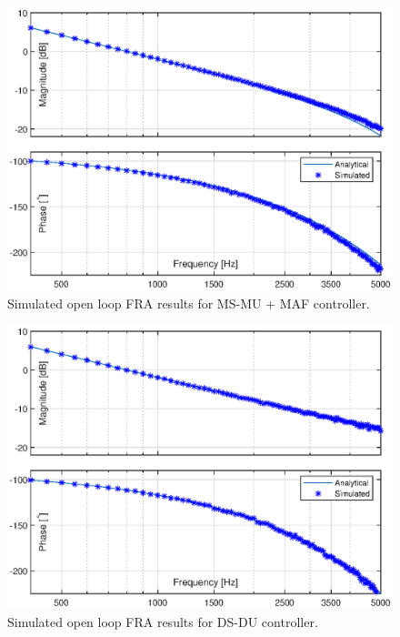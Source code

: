 \documentclass[journal]{IEEEtran}
\begin{document}
\begin{figure}[t!]
    \centerline{\includegraphics[width=0.95\linewidth]{figures/MSMUmaf_olfra.eps}}
    \caption{Simulated open loop FRA results for MS-MU + MAF controller.}
    \label{fig:MSMUmaf_olfra} 
\end{figure}
\begin{figure}[t!]
    \centerline{\includegraphics[width=0.95\linewidth]{figures/DSDU_olfra.eps}}
    \caption{Simulated open loop FRA results for DS-DU controller.}
    \label{fig:DSDU_olfra} 
\end{figure}
\end{document}
